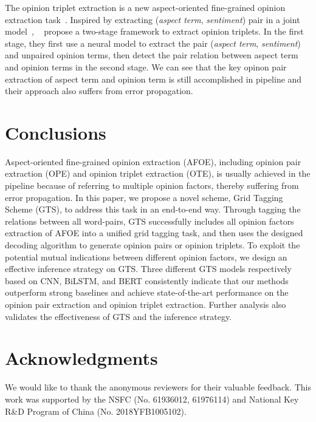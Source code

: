\documentclass[11pt,a4paper]{article}
\begin{document}
The opinion triplet extraction is a new aspect-oriented fine-grained opinion extraction task~\cite{DBLP:journals/corr/abs-1911-01616}. Inspired by extracting (\emph{aspect term}, \emph{sentiment}) pair in a joint model~\cite{DBLP:conf/aaai/LiBLL19,DBLP:conf/acl/LuoLLZ19,DBLP:conf/acl/HeLND19}, ~ propose a two-stage framework to extract opinion triplets. In the first stage, they first use a neural model to extract the pair (\emph{aspect term}, \emph{sentiment}) and unpaired opinion terms, then detect the pair relation between aspect term and opinion terms in the second stage. We can see that the key opinon pair extraction of aspect term and opinion term is still accomplished in pipeline and their approach also suffers from error propagation.












\section{Conclusions}
\label{conclusions}
Aspect-oriented fine-grained opinion extraction (AFOE), including opinion pair extraction (OPE) and opinion triplet extraction (OTE), is usually achieved in the pipeline because of referring to multiple opinion factors, thereby suffering from error propagation. In this paper, we propose a novel scheme, Grid Tagging Scheme (GTS), to address this task in an end-to-end way. Through tagging the relations between all word-pairs, GTS successfully includes all opinion factors extraction of AFOE into a unified grid tagging task, and then uses the designed decoding algorithm to generate opinion pairs or opinion triplets. To exploit the potential mutual indications between different opinion factors, we design an effective inference strategy on GTS. Three different GTS models respectively based on CNN, BiLSTM, and BERT consistently indicate that our methods outperform strong baselines and achieve state-of-the-art performance on the opinion pair extraction and opinion triplet extraction. Further analysis also validates the effectiveness of GTS and the inference strategy.

\section*{Acknowledgments}
We would like to thank the anonymous reviewers for their valuable feedback. This work was supported by the NSFC (No. 61936012, 61976114) and National Key R\&D Program of China (No. 2018YFB1005102).







\end{document}
